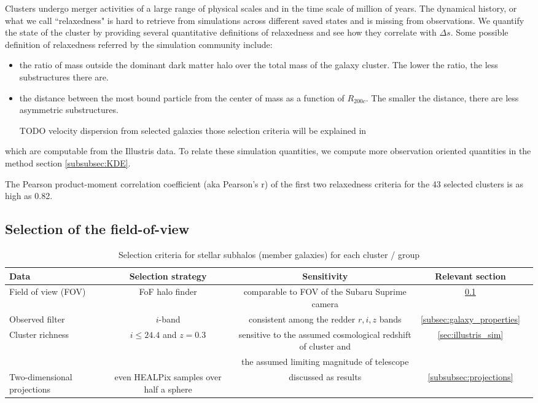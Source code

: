 Clusters undergo merger activities of a large range of physical scales and 
in the time scale of million of years. 
The dynamical history, or what we call ``relaxedness" is hard to retrieve from 
simulations across different saved states and is missing from observations.
We quantify the state of the cluster by providing several quantitative
definitions of relaxedness and see how they correlate with $\Delta s$.
Some possible definition of relaxedness referred by the simulation community
include:
\begin{itemize}
	\item the ratio of mass outside the dominant dark matter halo over the total mass
		of the galaxy cluster. The lower the ratio, the less substructures there are. 
	\item the distance between the most bound particle from the center of mass as a
		function of $R_{200c}$. The smaller the distance, there are less asymmetric 
		substructures. 
	\item [TODO] velocity dispersion from selected galaxies those selection
		criteria will be explained in  
\end{itemize}
which are computable from the Illustris data. 
To relate these simulation quantities, we compute more observation oriented 
quantities in the method section \ref{subsubsec:KDE}. 

The Pearson product-moment correlation coefficient
(aka Pearson's r) of the first
two relaxedness criteria for the 43 selected clusters is as high as 0.82. 

\subsection{Selection of the field-of-view}
\label{sec:FOV}

\begin{table*}
\begin{center}
\begin{minipage}{180mm} 
	\caption{ Selection criteria for stellar subhalos (member galaxies) for each
		cluster / group 
\label{tab:member_galaxy_selections}} 
	\begin{tabular}{@{}lcccc@{}}
\hline 
Data &  Selection strategy  & Sensitivity & Relevant section  \\ \hline
Field of view (FOV) & FoF halo finder& comparable to FOV of the Subaru
Suprime camera & \ref{sec:FOV}  \\ 
Observed filter & $i$-band & consistent among the redder $r, i, z$ bands &   
\ref{subsec:galaxy_properties}
\\ 
Cluster richness  & $i \leq 24.4$ and $z = 0.3$  & sensitive to
the assumed cosmological redshift of cluster and & \ref{sec:illustris_sim} \\ 
& & the assumed limiting magnitude of telescope &   \\
Two-dimensional projections & even HEALPix samples over half a sphere &
discussed as results  & \ref{subsubsec:projections}\\  
\hline
\end{tabular} 
\footnotesize{
}
\end{minipage}
\end{center} 
\end{table*}

